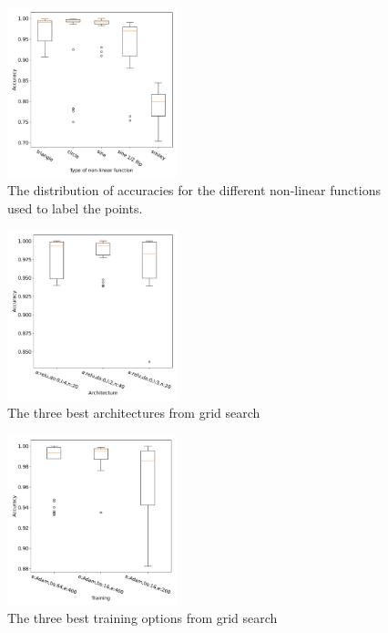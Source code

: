 \documentclass[prl,twocolumn]{revtex4-1}
\begin{document}
\begin{figure}[!tb]
  \includegraphics[width=0.44\textwidth]{task_1/figures/types_box_30.pdf}
  \caption{
  The distribution of accuracies for the different non-linear functions used to label the points. 
  }
  \label{fig:rescale_box}
\end{figure}

\begin{figure}[!tb]
  \includegraphics[width=0.44\textwidth]{task_1/figures/architecture_box_30.pdf}
  \caption{
  The three best architectures from grid search
  }
  \label{fig:architecture_gs_box}
\end{figure}

\begin{figure}[!tb]
  \includegraphics[width=0.44\textwidth]{task_1/figures/training_box_30.pdf}
  \caption{
  The three best training options from grid search
  }
  \label{fig:architecture_gs_box}
\end{figure}
\end{document}
